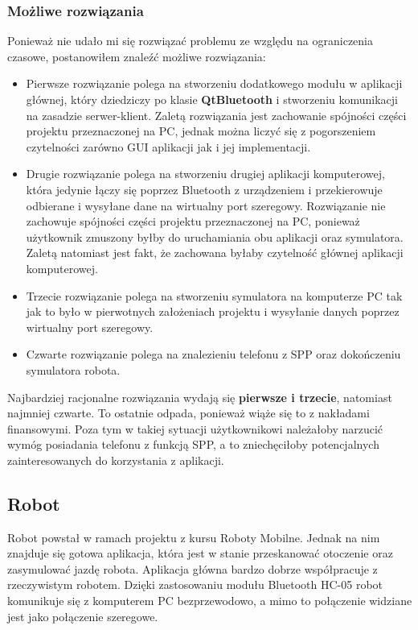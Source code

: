 \documentclass[a4paper,12pt]{article}
\begin{document}
\subsubsection{Możliwe rozwiązania}
Ponieważ nie udało mi się rozwiązać problemu ze względu na ograniczenia czasowe, postanowiłem znaleźć możliwe rozwiązania:
\begin{itemize}
\item Pierwsze rozwiązanie polega na stworzeniu dodatkowego modułu w aplikacji głównej, który dziedziczy po klasie \textbf{QtBluetooth} i stworzeniu komunikacji na zasadzie serwer-klient. Zaletą rozwiązania jest zachowanie spójności części projektu przeznaczonej na PC, jednak można liczyć się z pogorszeniem czytelności zarówno GUI aplikacji jak i jej implementacji.
\item Drugie rozwiązanie polega na stworzeniu drugiej aplikacji komputerowej, która jedynie łączy się poprzez Bluetooth z urządzeniem i przekierowuje odbierane i wysyłane dane na wirtualny port szeregowy. Rozwiązanie nie zachowuje spójności części projektu przeznaczonej na PC, ponieważ użytkownik zmuszony byłby do uruchamiania obu aplikacji oraz symulatora. Zaletą natomiast jest fakt, że zachowana byłaby czytelność głównej aplikacji komputerowej.
\item Trzecie rozwiązanie polega na stworzeniu symulatora na komputerze PC tak jak to było w pierwotnych założeniach projektu i wysyłanie danych poprzez wirtualny port szeregowy. 
\item Czwarte rozwiązanie polega na znalezieniu telefonu z SPP oraz dokończeniu symulatora robota. 
\end{itemize}
Najbardziej racjonalne rozwiązania wydają się \textbf{pierwsze i trzecie}, natomiast najmniej czwarte. To ostatnie odpada, ponieważ wiąże się to z nakładami finansowymi. Poza tym w takiej sytuacji użytkownikowi należałoby narzucić wymóg posiadania telefonu z funkcją SPP, a to zniechęciłoby potencjalnych zainteresowanych do korzystania z aplikacji. 
\subsection{Robot}
Robot powstał w ramach projektu z kursu Roboty Mobilne. Jednak na nim znajduje się gotowa aplikacja, która jest w stanie przeskanować otoczenie oraz zasymulować jazdę robota. Aplikacja główna bardzo dobrze współpracuje z rzeczywistym robotem. Dzięki zastosowaniu modułu Bluetooth HC-05 robot komunikuje się z komputerem PC bezprzewodowo, a mimo to połączenie widziane jest jako połączenie szeregowe.  
\end{document}
